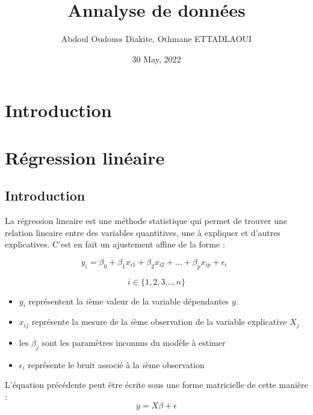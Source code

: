 \documentclass[
]{book}
\title{Annalyse de données}
\author{Abdoul Oudouss Diakite, Othmane ETTADLAOUI}
\date{30 May, 2022}
\providecommand{\tightlist}{%
  \setlength{\itemsep}{0pt}\setlength{\parskip}{0pt}}
\begin{document}
\maketitle

{
\setcounter{tocdepth}{1}
\tableofcontents
}
\hypertarget{introduction}{%
\chapter*{Introduction}\label{introduction}}

\hypertarget{linearModel}{%
\chapter{Régression linéaire}\label{linearModel}}

\hypertarget{introduction-1}{%
\section{Introduction}\label{introduction-1}}

La régression lineaire est une méthode statistique qui permet de trouver une relation lineaire entre des variables quantitives, une à expliquer et d'autres explicatives. C'est en fait un ajustement affine de la forme :

\begin{equation}
y_i = \beta_0 + \beta_1x_{i1} + \beta_2x_{i2} +\dots+\beta_px_{ip}+\epsilon_{i}\;\; 
\end{equation}

\[i\in\{1,2,3\dots,n\}\]

\begin{itemize}
\tightlist
\item
  \(y_i\) représentent la \(i\)ème valeur de la variable dépendantes \(y\).
\item
  \(x_{ij}\) représente la mesure de la \(i\)ème observation de la variable explicative \(X_j\)
\item
  les \(\beta_j\) sont les paramètres inconnus du modèle à estimer
\item
  \(\epsilon_i\) représente le bruit associé à la \(i\)ème observation\\
\end{itemize}

L'équation précédente peut être écrite sous une forme matricielle de cette manière :\\

\begin{equation}
y = X\beta +\epsilon
\end{equation}
\end{document}

